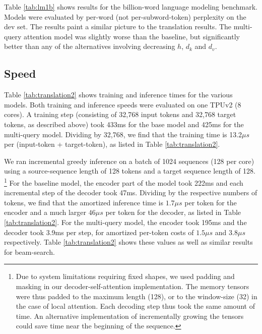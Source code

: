 \documentclass{article}
\begin{document}
Table \ref{tab:lm1b} shows results for the billion-word language modeling benchmark.  Models were evaluated by per-word (not per-subword-token) perplexity on the dev set.  The results paint a similar picture to the translation results.  The multi-query attention model was slightly worse than the baseline, but significantly better than any of the alternatives involving decreasing $h$, $d_k$ and $d_v$.

\subsection{Speed}

Table \ref{tab:translation2} shows training and inference times for the various models.  Both training and inference speeds were evaluated on one TPUv2 (8 cores).  A training step (consisting of 32,768 input tokens and 32,768 target tokens, as described above) took 433ms for the base model and 425ms for the multi-query model.  Dividing by 32,768, we find that the training time is 13.2$\mu s$ per (input-token + target-token), as listed in Table \ref{tab:translation2}.

We ran incremental greedy inference on a batch of 1024 sequences (128 per core) using a source-sequence length of 128 tokens and a target sequence length of 128.   \footnote{Due to system limitations requiring fixed shapes, we used padding and masking in our decoder-self-attention implementation.  The memory tensors were thus padded to the maximum length (128), or to the window-size (32) in the case of local attention.  Each decoding step thus took the same amount of time. An alternative implementation of incrementally growing the tensors could save time near the beginning of the sequence.}   For the baseline model, the encoder part of the model took 222ms and each incremental step of the decoder took 47ms.  Dividing by the respective numbers of tokens, we find that the amortized inference time is $1.7\mu s$ per token for the encoder and a much larger $46\mu s$ per token for the decoder, as listed in Table \ref{tab:translation2}.   For the multi-query model, the encoder took 195ms and the decoder took 3.9ms per step, for amortized per-token costs of $1.5\mu s$ and $3.8\mu s$ respectively.  Table \ref{tab:translation2} shows these values as well as similar results for beam-search.
\end{document}

